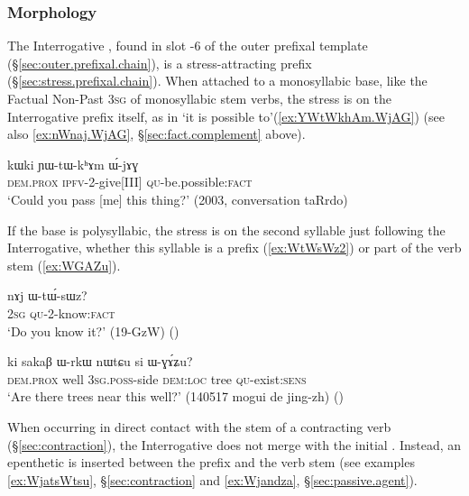  \subsubsection{Morphology} \label{sec:interrogative.W.morpho} 
 The Interrogative , found in slot -6 of the outer prefixal template (§\ref{sec:outer.prefixal.chain}), is a stress-attracting prefix (§\ref{sec:stress.prefixal.chain}). When attached to a monosyllabic base, like the Factual Non-Past \textsc{3sg} of monosyllabic stem verbs, the stress is on the Interrogative prefix itself, as in  `it is possible to'(\ref{ex:YWtWkhAm.WjAG}) (see also \ref{ex:nWnaj.WjAG}, §\ref{sec:fact.complement} above).
 
\begin{exe}
\ex \label{ex:YWtWkhAm.WjAG}
 \gll kɯki ɲɯ-tɯ-kʰɤm ɯ́-jɤɣ \\
 \textsc{dem}.\textsc{prox} \textsc{ipfv}-2-give[III] \textsc{qu}-be.possible:\textsc{fact} \\
\glt `Could you pass [me] this thing?' (2003, conversation taRrdo)
\end{exe}

If the base is polysyllabic, the stress is on the second syllable just following the Interrogative, whether this syllable is a prefix (\ref{ex:WtWsWz2}) or part of the verb stem (\ref{ex:WGAZu}).

\begin{exe}
\ex \label{ex:WtWsWz2}
 \gll nɤj ɯ-tɯ́-sɯz? \\
\textsc{2sg} \textsc{qu}-2-know:\textsc{fact} \\
\glt `Do you know it?' (19-GzW)  ()
\end{exe}

\begin{exe}
\ex \label{ex:WGAZu}
 \gll ki sakaβ ɯ-rkɯ nɯtɕu si ɯ-ɣɤ́ʑu? \\
 \textsc{dem}.\textsc{prox} well \textsc{3sg}.\textsc{poss}-side \textsc{dem}:\textsc{loc} tree \textsc{qu}-exist:\textsc{sens} \\
 \glt `Are there trees near this well?' (140517 mogui de jing-zh)
()
\end{exe}

When occurring in direct contact with the stem of a contracting verb (§\ref{sec:contraction}), the Interrogative  does not merge with the initial . Instead, an epenthetic  is inserted between the prefix and the verb stem (see examples \ref{ex:WjatsWtsu},  §\ref{sec:contraction} and \ref{ex:Wjandza}, §\ref{sec:passive.agent}).



